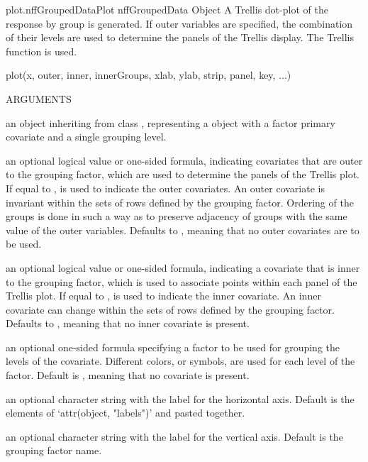 \documentclass[pdftex]{article} \usepackage{url,graphicx}
\begin{document}
\begin{Helpfile}{plot.nffGroupedData}{Plot nffGroupedData Object}
A Trellis dot-plot of the response by group is generated. If outer
variables are specified, the combination of their levels are used to
determine the panels of the Trellis display. The Trellis function
 is used.
\begin{Example}
plot(x, outer, inner, innerGroups, xlab, ylab, strip, panel, 
     key, ...)
\end{Example}
\begin{Argument}{ARGUMENTS}
\item[\Co{x:}]
an object inheriting from class ,
representing a  object with a factor primary
covariate and a single grouping level.
\item[\Co{outer:}]
an optional logical value or one-sided formula,
indicating covariates that are outer to the grouping factor, which
are used to determine the panels of the Trellis plot. If
equal to ,  is used to indicate the
outer covariates. An outer covariate is invariant within the sets
of rows defined by the grouping factor.  Ordering of the groups is
done in such a way as to preserve adjacency of groups with the same
value of the outer variables. Defaults to , meaning that
no outer covariates are to be used.
\item[\Co{inner:}]
an optional logical value or one-sided formula, indicating
a covariate that is inner to the grouping factor, which is used to
associate points within each panel of the Trellis plot. If
equal to ,  is used to indicate the
inner covariate. An inner covariate can change within the sets of
rows defined by the grouping  factor. Defaults to ,
meaning that no inner covariate  is present. 
\item[\Co{innerGroups:}]
an optional one-sided formula specifying a factor
to be used for grouping the levels of the 
covariate. Different colors, or symbols, are used for each level
of the  factor. Default is , meaning
that no  covariate is present.
\item[\Co{xlab:}]
an optional character string with the label for the
horizontal axis. Default is the  elements of `attr(object,
     "labels")' and  pasted together.
\item[\Co{ylab:}]
an optional character string with the label for the
vertical axis. Default is the grouping factor name.

\end{Argument}
\end{Helpfile}
\end{document}
